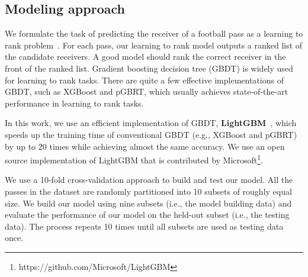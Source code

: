 

\subsection{Modeling approach}

We formulate the task of predicting the receiver of a football pass as a learning to rank problem~\cite{liu2009learning}. 
For each pass, our learning to rank model outputs a ranked list of the candidate receivers. 
A good model should rank the correct receiver in the front of the ranked list.
Gradient boosting decision tree (GBDT) is widely used for learning to rank tasks.
There are quite a few effective implementations of GBDT, such as XGBoost and pGBRT, which usually achieves state-of-the-art performance in learning to rank tasks.

In this work, we use an efficient implementation of GBDT, \textbf{LightGBM}~\cite{NIPS2017_6907}, which speeds up the training time of conventional GBDT (e.g., XGBoost and pGBRT) by up to 20 times while achieving almost the same accuracy. 
We use an open source implementation of LightGBM that is contributed by Microsoft\footnote{https://github.com/Microsoft/LightGBM}.

We use a 10-fold cross-validation approach to build and test our model. 
All the passes in the dataset are randomly partitioned into 10 subsets of roughly equal size. 
We build our model using nine subsets (i.e., the model building data) and evaluate the performance of our model on the held-out subset (i.e., the testing data).
The process repeats 10 times until all subsets are used as testing data once.

